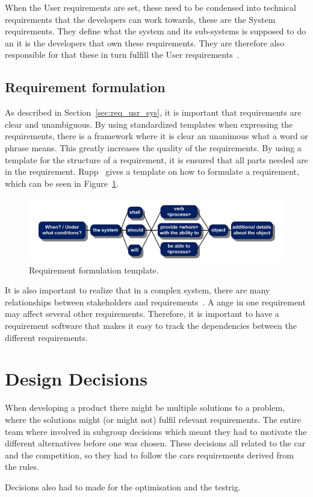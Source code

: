 When the User requirements are set, these need to be condensed into technical
requirements that the developers can work towards, these are the System
requirements. They define what the system and its sub-systems is supposed to do
an it is the developers that own these requirements. They are therefore also
responsible for that these in turn fulfill the User requirements~\cite{ibm_req}.

\subsection{Requirement formulation}
As described in Section~\ref{sec:req_usr_sys}, it is important that requirements
are clear and unambiguous. By using standardized templates when expressing the
requirements, there is a framework where it is clear an unanimous what a word or
phrase means.  This greatly increases the quality of the
requirements\cite{rupp2014}.  By using a template for the structure of a
requirement, it is ensured that all parts needed are in the requirement.
Rupp~\cite{rupp2014} gives a template on how to formulate a
requirement, which can be seen in Figure~\ref{fig:req_template}.
\begin{figure}[H]
    \centering
    \includegraphics[width=\textwidth]{./img/introduction_req_template.PNG}
    \caption{Requirement formulation template.}\label{fig:req_template}
\end{figure}
It is also important to realize that in a complex system, there are many
relationships between stakeholders and requirements~\cite{ibm_req}. A ange in
one requirement may affect several other requirements. Therefore, it is
important to have a requirement software that makes it easy to track the
dependencies between the different requirements.


\section{Design Decisions}
When developing a product there might be multiple solutions to a problem, 
where the solutions might (or might not) fulfil relevant requirements. 
The entire team where involved in subgroup decisions which meant they had to motivate
the different alternatives before one was chosen. These decisions all related to the 
car and the competition, so they had to follow the cars requirements derived from the rules.

Decisions also had to made for the optimisation and the testrig. 
